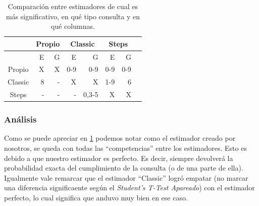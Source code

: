 \newpage

\begin{table}[h!t]
\centering %
\begin{tabular}{c rrrrrrr} %
\hline\hline %
\ &\multicolumn{2}{c}{Propio}& \multicolumn{2}{c}{Classic}& \multicolumn{2}{c}{Steps} \\ [0.5ex] 
\hline %
 & E & G & E & G & E & G &  \\  
\hline
Propio &X  &X  &0-9 &0-9 &0-9 &0-9 \\ %
\hline
Classic &8  &-  &X &X &1-9 &6 \\
\hline
Steps &-  &- &- &0,3-5 &X &X  \\[1ex] %
\hline %
\end{tabular}
\caption{Comparación entre estimadores de cual es más significativo, en qué tipo consulta y en qué columnas. } %
\label{tab:hresult}
\end{table}

\subsubsection*{Análisis}
Como se puede apreciar en \ref{tab:hresult} podemos notar como el estimador creado por nosotros, se queda con todas las ``competencias'' entre los estimadores. Esto es debido a que nuestro estimador es perfecto. Es decir, siempre devolverá la probabilidad exacta del cumplimiento de la consulta (o de una parte de ella). Igualmente vale remarcar que el estimador ``Classic'' logró empatar (no marcar una diferencia significaente según el \textit{Student’s T-Test Apareado}) con el estimador perfecto, lo cual significa que anduvo muy bien en ese caso.
